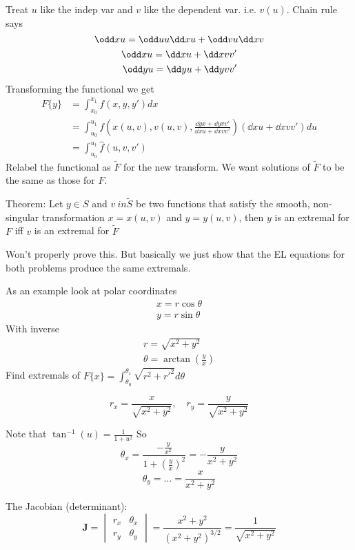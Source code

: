 \documentclass{X:/Documents/Coding/Latex/myassignment}
\begin{document}
Treat $u$ like the indep var and $v$ like the dependent var. i.e. $v(u)$.
Chain rule says
\[\odd xu = \odd uu \dd x u + \odd vu \dd xv\]
\begin{align*}
	\odd xu = \dd x u + \dd x v v'\\
	\odd yu = \dd y u + \dd y v v'
\end{align*}
Transforming the functional we get
\begin{align*}
	F\{y\} &= \int_{x_0}^{x_1} f(x,y,y') dx\\
	&= \int_{u_0}^{u_1} f\left(x(u,v), v(u,v), \frac{\dd yx + \dd yv v'}{\dd xu + \dd xv v'}\right) (\dd xu + \dd xv v')  du\\
	&= \int_{u_0}^{u_1} \hat{f}(u,v,v')
\end{align*}
Relabel the functional as $\tilde{F}$ for the new transform. We want solutions of $\tilde{F}$ to be the same as those for $F$.

Theorem:
Let $y \in S$ and $v \ in \tilde{S}$ be two functions that satisfy the smooth, non-singular transformation $x= x(u,v)$ and $y = y(u,v)$, then $y$ is an extremal for $F$ iff $v$ is an extremal for $\tilde{F}$

Won't properly prove this. But basically we just show that the EL equations for both problems produce the same extremals.






As an example look at polar coordinates
\begin{align*}
	x = r\cos\theta\\
	y = r\sin\theta
\end{align*}
With inverse
\begin{align*}
	r = \sqrt{x^2+y^2}\\
	\theta = \arctan\left(\frac yx\right)
\end{align*}
Find extremals of $F\{x\} = \int_{\theta_0}^{\theta_1} \sqrt{r^2 + r'^2} d\theta$


\[r_x = \frac{x}{\sqrt{x^2+y^2}}, \quad r_y = \frac{y}{\sqrt{x^2+y^2}}\]

Note that $\tan^{-1}(u) = \frac{1}{1+u^2}$
So
\[\theta_x = \frac{-\frac y{x^2}}{1 + \left(\frac yx\right)^2} = -\frac{y}{x^2+y^2}\]
\[\theta_y = \ldots = \frac{x}{x^2+y^2}\]

The Jacobian (determinant):
\[\mathbf{J} = \begin{vmatrix}
	r_x & \theta_x \\ r_y & \theta_y
\end{vmatrix} = \frac{x^2 + y^2}{(x^2+y^2)^{3/2}}  = \frac{1}{\sqrt{x^2+y^2}}\]
\end{document}
